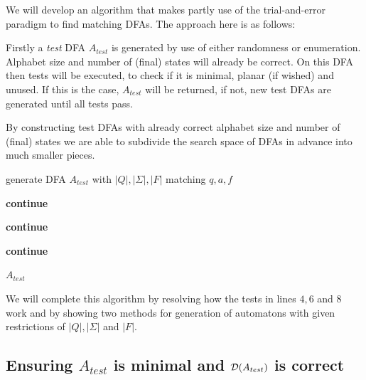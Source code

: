 We will develop an algorithm that makes partly use of the trial-and-error paradigm to find matching DFAs. The approach here is as follows:

Firstly a \emph{test} DFA $A_{test}$ is generated by use of either randomness or enumeration. Alphabet size and number of (final) states will already be correct. On this DFA then tests will be executed, to check if it is minimal, planar (if wished) and unused. If this is the case, $A_{test}$ will be returned, if not, new test DFAs are generated until all tests pass.

By constructing test DFAs with already correct alphabet size and number of (final) states we are able to subdivide the search space of DFAs in advance into much smaller pieces.


\vspace{0.2cm}
\begin{algorithmic}[1]
		
			\vspace{0.2cm}
		
			\State generate DFA $A_{test}$ with $|Q|, |\Sigma|, |F|$ matching $q, a, f$
			
			\vspace{0.2cm}
			
				\State \textbf{continue}
			\EndIf
			
				\State \textbf{continue}
			\EndIf
			
				\State \textbf{continue}
			\EndIf
			
			\vspace{0.2cm}
			
			\State\Return $A_{test}$
		\EndWhile
	\EndFunction
\end{algorithmic}
\vspace{0.2cm}
We will complete this algorithm by resolving how the tests in lines $4, 6$ and $8$ work and by showing two methods for generation of automatons with given restrictions of $|Q|, |\Sigma|$ and $|F|$.

\subsection{Ensuring $A_{test}$ is minimal and $\mathcal{D}(A_{test})$ is correct}

